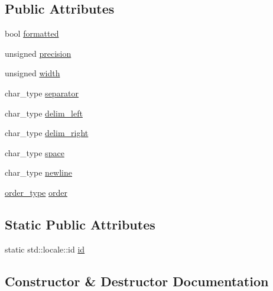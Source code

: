 \subsection*{Public Attributes}
\begin{DoxyCompactItemize}
\item 
bool \hyperlink{classglm_1_1io_1_1format__punct_ab28088e6eef03fe4222fa8a5dd95288e}{formatted}
\item 
unsigned \hyperlink{classglm_1_1io_1_1format__punct_a5a15d396b7c963df9dec5e124236dc02}{precision}
\item 
unsigned \hyperlink{classglm_1_1io_1_1format__punct_a95d32ca2330bbf7c50d3e066b7a851db}{width}
\item 
char\+\_\+type \hyperlink{classglm_1_1io_1_1format__punct_ac561eb04fc2a1282ef38ea15f8e640ee}{separator}
\item 
char\+\_\+type \hyperlink{classglm_1_1io_1_1format__punct_ab1beed331269a39b06d17d02cf727d7c}{delim\+\_\+left}
\item 
char\+\_\+type \hyperlink{classglm_1_1io_1_1format__punct_a62fb1280404360463ec5af7144aa0949}{delim\+\_\+right}
\item 
char\+\_\+type \hyperlink{classglm_1_1io_1_1format__punct_adf9a915938727793de1daca07dcdfa4e}{space}
\item 
char\+\_\+type \hyperlink{classglm_1_1io_1_1format__punct_a8ddf8abdb0ebbdbb7eca08d7a777956e}{newline}
\item 
\hyperlink{namespaceglm_1_1io_a3497781803fe594a37177e05ab2a795f}{order\+\_\+type} \hyperlink{classglm_1_1io_1_1format__punct_a9de1f3b7120a036ec0ab394d2036d0aa}{order}
\end{DoxyCompactItemize}
\subsection*{Static Public Attributes}
\begin{DoxyCompactItemize}
\item 
static std\+::locale\+::id \hyperlink{classglm_1_1io_1_1format__punct_a763f60aeaecec9290917ed1d83b79838}{id}
\end{DoxyCompactItemize}


\subsection{Constructor \& Destructor Documentation}
\hypertarget{classglm_1_1io_1_1format__punct_ae56e7a14fac2516658837281b9da4659}{}
